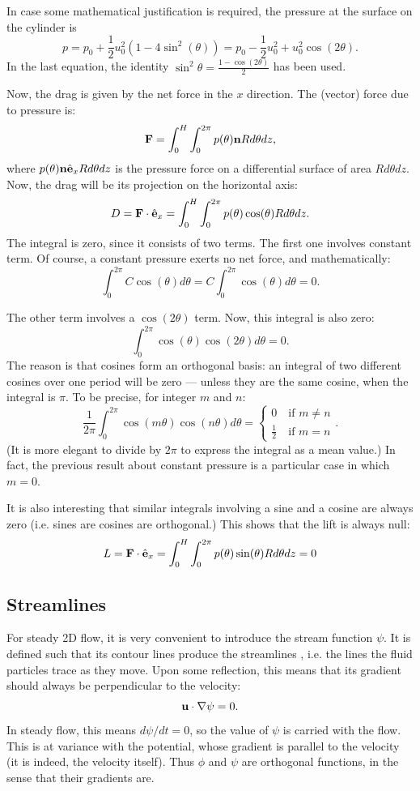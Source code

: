 In case some mathematical justification is required, the pressure
at the surface on the cylinder is
\[
 p= p_0 + \frac12  u_0^2 \left(1 -  4   \sin^2(\theta) \right) =
 p_0 -\frac12 u_0^2 + u_0^2 \cos(2\theta)  .
\]
In the last equation, the identity
$\sin^{2}\theta ={\frac {1-\cos(2\theta )}{2}}$ has been used.

Now, the drag is given by the net force in the $x$ direction. The
(vector) force due to pressure is:
\[
\mathbf{F} = \int_0^H \int_0^{2\pi}   p(\theta)  \mathbf{n}  R d\theta  dz ,
\]
where $p(\theta) \mathbf{n} \hat{\mathbf{e}}_x R d\theta dz $ is the pressure force on a
differential surface of area $ R d\theta dz$. Now, the drag will be
its projection on the horizontal axis:
\[
D= \mathbf{F} \cdot \hat{\mathbf{e}}_x = \int_0^H \int_0^{2\pi}
p(\theta) \cos(\theta) R d\theta dz .
\]
The integral is zero, since it consists of two terms. The first one
involves constant term. Of course, a constant pressure exerts no net
force, and mathematically:
\[
 \int_0^{2\pi} C \cos(\theta) d\theta = C  \int_0^{2\pi}  \cos(\theta) d\theta = 0 .
\]

The other term involves a $\cos(2\theta)$ term. Now, this integral is also
zero:
\[
 \int_0^{2\pi}  \cos(\theta)  \cos(2 \theta) d\theta = 0 .
\]
The reason is that cosines form an
orthogonal basis: an integral of two different cosines over one period
will be zero --- unless they are the same cosine, when the integral is
$\pi$. To be precise, for integer $m$ and $n$:
\[
\frac{1}{2\pi} \int_0^{2\pi}  \cos(m \theta) \cos(n \theta)  d\theta = 
\begin{cases}
0 \quad \text{if } m\ne n \\
\frac12 \quad \text{if } m = n 
\end{cases} .
\]
(It is more elegant to divide by $2\pi$ to express the integral as a
mean value.) In fact, the previous result about constant pressure
is a particular case in which $m=0$.

It is also interesting that similar integrals involving a sine and a
cosine are always zero (i.e. sines are cosines are orthogonal.)
This shows that the lift is always null:
\[
L= \mathbf{F} \cdot \hat{\mathbf{e}}_x = \int_0^H \int_0^{2\pi}
p(\theta) \sin(\theta) R d\theta dz = 0
\]



\subsection{Streamlines}

For steady 2D flow, it is very convenient to introduce the stream
function $\psi$. It is defined such that its contour lines produce the
streamlines , i.e. the lines the fluid particles
trace as they move. Upon some reflection, this means that its gradient
should always be perpendicular to the velocity:
\begin{equation}
  \label{eq:stream_perp_to_u}
  \mathbf{u} \cdot \nabla\psi = 0 .
\end{equation}
In steady flow, this means $d\psi/dt=0$, so the value of $\psi$ is
carried with the flow. This is at variance with the potential, whose
gradient is parallel to the velocity (it is indeed, the velocity
itself). Thus $\phi$ and $\psi$ are orthogonal functions, in the sense
that their gradients are.


